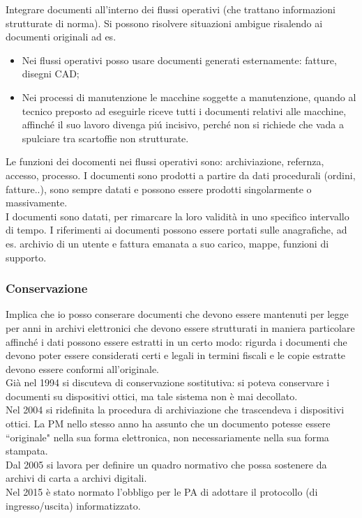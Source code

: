 Integrare documenti all'interno dei flussi operativi (che trattano
informazioni strutturate di norma). Si possono risolvere situazioni
ambigue risalendo ai documenti originali ad es. 

\begin{itemize}
  \item 
    Nei flussi operativi posso usare documenti generati esternamente: fatture, 
    disegni CAD; 
  \item 
    Nei processi di manutenzione le macchine soggette a manutenzione,
    quando al tecnico preposto ad eseguirle riceve tutti i documenti
    relativi alle macchine, affinch\'e il suo lavoro divenga pi\'u incisivo,
    perch\'e non si richiede che vada a spulciare tra scartoffie non
    strutturate.
\end{itemize}

Le funzioni dei docomenti nei flussi operativi sono: archiviazione,
refernza, accesso, processo. I documenti sono prodotti a partire da dati
procedurali (ordini, fatture..), sono sempre datati e possono essere
prodotti singolarmente o massivamente.\\
I documenti sono datati, per rimarcare la loro validit\`a in uno specifico
intervallo di tempo. I riferimenti ai documenti possono essere portati
sulle anagrafiche, ad es. archivio di un utente e fattura emanata a suo
carico, mappe, funzioni di supporto.

\subsubsection{Conservazione}

Implica che io posso conserare documenti che devono essere mantenuti per
legge per anni in archivi elettronici che devono essere strutturati in
maniera particolare affinch\'e i dati possono essere estratti in un certo
modo: rigurda i documenti che devono poter essere considerati certi e legali in
termini fiscali e le copie estratte devono essere conformi all'originale.\\

Gi\`a nel 1994 si discuteva di conservazione sostitutiva: si poteva
conservare i documenti su dispositivi ottici, ma tale sistema non \`e mai
decollato.\\
Nel 2004 si ridefinita la procedura di archiviazione che trascendeva i
dispositivi ottici. La PM nello stesso anno ha assunto che un documento
potesse essere ``originale" nella sua forma elettronica, non
necessariamente nella sua forma stampata.\\
Dal 2005 si lavora per definire un quadro normativo che possa sostenere
da archivi di carta a archivi digitali.\\
Nel 2015 \`e stato normato l'obbligo per le PA di adottare il protocollo
(di ingresso/uscita) informatizzato.

